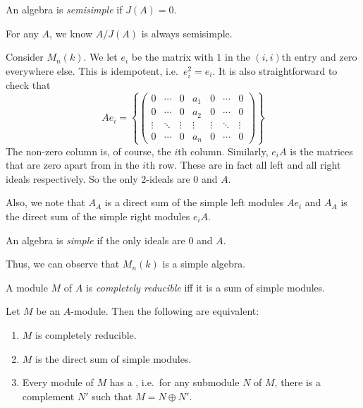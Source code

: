 \documentclass[a4paper]{article}
\begin{document}
\begin{defi}
  An algebra is \emph{semisimple} if $J(A) = 0$.
\end{defi}

\begin{eg}
  For any $A$, we know $A/J(A)$ is always semisimple.
\end{eg}

\begin{eg}
  Consider $M_n(k)$. We let $e_i$ be the matrix with $1$ in the $(i, i)$th entry and zero everywhere else. This is idempotent, i.e.\ $e_i^2 = e_i$. It is also straightforward to check that
  \[
    A e_i =
    \left\{
      \begin{pmatrix}
        0 & \cdots & 0 & a_1 & 0 & \cdots & 0\\
        0 & \cdots & 0 & a_2 & 0 & \cdots & 0\\
        \vdots & \ddots & \vdots & \vdots & \vdots & \ddots & \vdots\\
        0 & \cdots & 0 & a_n & 0 & \cdots & 0
      \end{pmatrix}
    \right\}
  \]
  The non-zero column is, of course, the $i$th column. Similarly, $e_i A$ is the matrices that are zero apart from in the $i$th row. These are in fact all left and all right ideals respectively. So the only $2$-ideals are $0$ and $A$.

  Also, we note that $A_A$ is a direct sum of the simple left modules $A e_i$ and $A_A$ is the direct sum of the simple right modules $e_i A$.
\end{eg}

\begin{defi}
  An algebra is \emph{simple} if the only ideals are $0$ and $A$.
\end{defi}
Thus, we can observe that $M_n(k)$ is a simple algebra.

\begin{defi}
  A module $M$ of $A$ is \emph{completely reducible} iff it is a sum of simple modules.
\end{defi}

\begin{prop}
  Let $M$ be an $A$-module. Then the following are equivalent:
  \begin{enumerate}
    \item $M$ is completely reducible.
    \item $M$ is the direct sum of simple modules.
    \item Every module of $M$ has a , i.e.\ for any submodule $N$ of $M$, there is a complement $N'$ such that $M = N \oplus N'$.
  \end{enumerate}
\end{prop}
\end{document}
